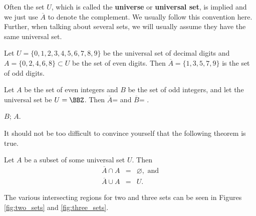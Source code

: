 \begin{rem}
Often the set $U$, which is called the {\bf universe} or {\bf universal set}, 
is implied and we just use $\overline{A}$ to denote the complement.  
We usually follow this convention here.  
Further, when talking about several sets, we will usually assume they have the
same universal set.
\end{rem}


\begin{exa}
Let $U = \{0,1,2,3,4,5,6,7,8,9\}$ be the universal set of decimal digits and
$A = \{0,2,4,6,8\}\subset U$ be the set of even digits. Then
$\overline{A} = \{1,3,5,7,9\}$ is the set of odd digits.
\end{exa}


\begin{exer}
Let $A$ be the set of even integers and $B$ be the set of odd integers, and 
let the universal set be $U=\BBZ$. 
Then $\overline{A}$=  and $\overline{B}$= .
\begin{answer}
$B$; $A$.
\end{answer} 
\end{exer}

It should not be too difficult to convince yourself that the following theorem
is true.

\begin{thm}
Let $A$ be a subset of some universal set $U$.  Then 
\begin{eqnarray*}
\overline{A}\cap A &=& \varnothing,\mbox{ and}\\
\overline{A}\cup A &=& U.
\end{eqnarray*}
\end{thm}




 The various intersecting regions for two and three sets can be
seen in Figures \ref{fig:two_sets} and \ref{fig:three_sets}.

